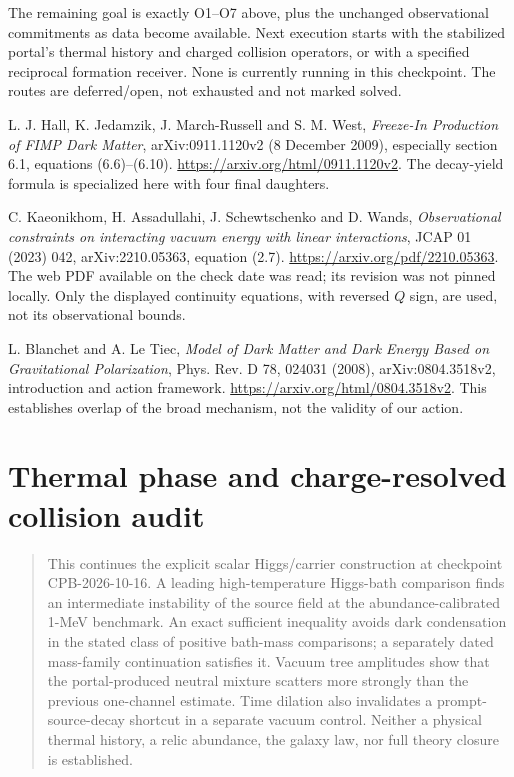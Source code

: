 \documentclass[11pt]{article}
\begin{document}
The remaining goal is exactly O1--O7 above, plus the unchanged observational
commitments as data become available. Next execution starts with the
stabilized portal's thermal history and charged collision operators, or with a
specified reciprocal formation receiver. None is currently running in this
checkpoint. The routes are deferred/open, not exhausted and not marked solved.

\begin{thebibliography}{9}
 L. J. Hall, K. Jedamzik, J. March-Russell and S. M. West,
\emph{Freeze-In Production of FIMP Dark Matter}, arXiv:0911.1120v2
(8 December 2009), especially section 6.1, equations (6.6)--(6.10).
\url{https://arxiv.org/html/0911.1120v2}.
The decay-yield formula is specialized here with four final daughters.

 C. Kaeonikhom, H. Assadullahi, J. Schewtschenko and D. Wands,
\emph{Observational constraints on interacting vacuum energy with linear
interactions}, JCAP 01 (2023) 042, arXiv:2210.05363,
equation (2.7). \url{https://arxiv.org/pdf/2210.05363}.
The web PDF available on the check date was read; its revision was not pinned
locally. Only the displayed continuity equations, with reversed $Q$ sign,
are used, not its observational bounds.

 L. Blanchet and A. Le Tiec,
\emph{Model of Dark Matter and Dark Energy Based on Gravitational Polarization},
Phys. Rev. D 78, 024031 (2008), arXiv:0804.3518v2,
introduction and action framework.
\url{https://arxiv.org/html/0804.3518v2}.
This establishes overlap of the broad mechanism, not the validity of our action.
\end{thebibliography}

\clearpage

\part{Thermal phase and charge-resolved collision audit}

\begin{abstract}
This continues the explicit scalar Higgs/carrier construction at checkpoint
CPB-2026-10-16. A leading high-temperature Higgs-bath comparison finds an
intermediate instability of the source field at the abundance-calibrated
1-MeV benchmark. An exact sufficient inequality avoids dark condensation in
the stated class of positive bath-mass comparisons; a separately dated
mass-family continuation satisfies it. Vacuum tree amplitudes show that the
portal-produced neutral mixture scatters more strongly than the previous
one-channel estimate. Time dilation also invalidates a prompt-source-decay
shortcut in a separate vacuum control. Neither a physical thermal history,
a relic abundance, the galaxy law, nor full theory closure is established.
\end{abstract}
\end{document}
